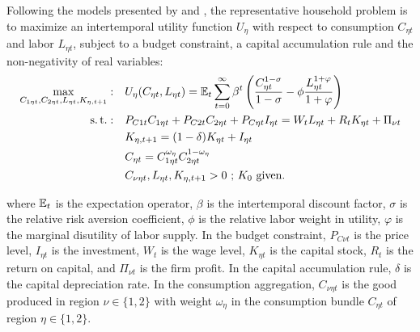 \documentclass[
	thesis.tex
	]{subfiles}
\begin{document}
Following the models presented by \textcite{costa_junior_understanding_2016} and \textcite{solis-garcia_ucb_2022}, the representative household problem is to maximize an intertemporal utility function $U_{\eta}$ with respect to consumption $C_{\eta t}$ and labor $L_{\eta t}$, subject to a budget constraint, a capital accumulation rule and the non-negativity of real variables:
\begin{align}
	\max_{C_{1\eta t}, C_{2\eta t}, L_{\eta t},K_{\eta, t+1}}: \quad & U_{\eta}(C_{\eta t},L_{\eta t}) = {\mathbb{E}_{t}} \sum_{t=0}^{\infty} \beta^t \left(\frac{C_{\eta t}^{1-\sigma}}{1-\sigma} - \phi \frac{L_{\eta t}^{1+\varphi}}{1+\varphi} \right) \label{eq:reg-utility-function-0} \\
	\operatorname{s.t.}: \quad & P_{C1t} C_{1\eta t} + P_{C2t} C_{2\eta t} + P_{C\eta t} I_{\eta t} = W_t L_{\eta t} + R_t K_{\eta t} + \Pi_{\nu t} \label{eq:reg-budget-constraint} \\
	\quad & K_{\eta, t+1} = (1-\delta)K_{\eta t} + I_{\eta t} \label{eq:reg-law-of-motion-for-capital} \\
	\quad & C_{\eta t} = C_{1\eta t}^{\omega_{\eta}} C_{2\eta t}^{1-\omega_{\eta}} \label{eq:reg-consumption-aggregation} \\
	\quad & C_{\nu\eta t}, L_{\eta t}, K_{\eta, t+1} > 0 \text{ ; $K_0$ given.} \nonumber
\end{align}

where ${\mathbb{E}_{t}}$ is the expectation operator, $\beta$ is the intertemporal discount factor, $\sigma$ is the relative risk aversion coefficient, $\phi$ is the relative labor weight in utility, $\varphi$ is the marginal disutility of labor supply. In the budget constraint, $P_{C\nu t}$ is the price level, $I_{\eta t}$ is the investment, $W_t$ is the wage level, $K_{\eta t}$ is the capital stock, $R_t$ is the return on capital, and $\Pi_{\nu t}$ is the firm profit. In the capital accumulation rule, $\delta$ is the capital depreciation rate. In the consumption aggregation, $C_{\nu \eta t}$ is the good produced in region $\nu \in \{1,2\}$ with weight ${\omega_\eta}$ in the consumption bundle $C_{\eta t}$ of region $\eta \in \{1,2\}$.
\end{document}
